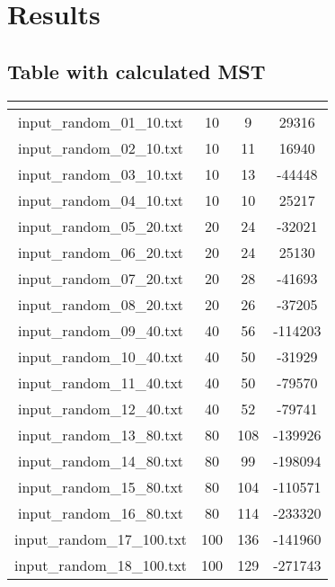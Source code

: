 \section{Results}\label{results}

\subsection{Table with calculated MST}
	
	\renewcommand{\arraystretch}{1.5}
	\begin{longtable}{|c|c|c|c|}
		\hline
		\rowcolor{title_row}
		\textbf{\color{title_text}{Input file}} &
		\textbf{\color{title_text}{num\_nodes}} & \textbf{\color{title_text}{num\_edges}} & \textbf{\color{title_text}{MST}}\\
		\hline
		\endhead
		input\_random\_01\_10.txt & 10 & 9 & 29316 \\ \hline 
		input\_random\_02\_10.txt & 10 & 11 & 16940 \\ \hline 
		input\_random\_03\_10.txt & 10 & 13 & -44448 \\ \hline
		input\_random\_04\_10.txt & 10 & 10 & 25217 \\ \hline
		input\_random\_05\_20.txt & 20 & 24 & -32021 \\ \hline
		input\_random\_06\_20.txt & 20 & 24 & 25130 \\ \hline
		input\_random\_07\_20.txt & 20 & 28 & -41693 \\ \hline
		input\_random\_08\_20.txt & 20 & 26 & -37205 \\ \hline
		input\_random\_09\_40.txt & 40 & 56 & -114203 \\ \hline
		input\_random\_10\_40.txt & 40 & 50 & -31929 \\ \hline
		input\_random\_11\_40.txt & 40 & 50 & -79570
		 \\ \hline
		input\_random\_12\_40.txt & 40 & 52 & -79741
		 \\ \hline
		input\_random\_13\_80.txt & 80 & 108 & -139926 \\ \hline
		input\_random\_14\_80.txt & 80 & 99 & -198094 \\ \hline
		input\_random\_15\_80.txt & 80 & 104 & -110571
		 \\ \hline
		input\_random\_16\_80.txt & 80 & 114 & -233320
		 \\ \hline
		input\_random\_17\_100.txt & 100 & 136 & -141960
		 \\ \hline
		input\_random\_18\_100.txt & 100 & 129 & -271743
		 \\ \hline

\end{longtable}

